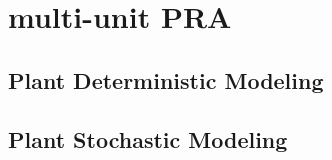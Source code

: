 \section{multi-unit PRA}
\label{sec:multiUnitPRA}

\subsection{Plant Deterministic Modeling}

\subsection{Plant Stochastic Modeling}
